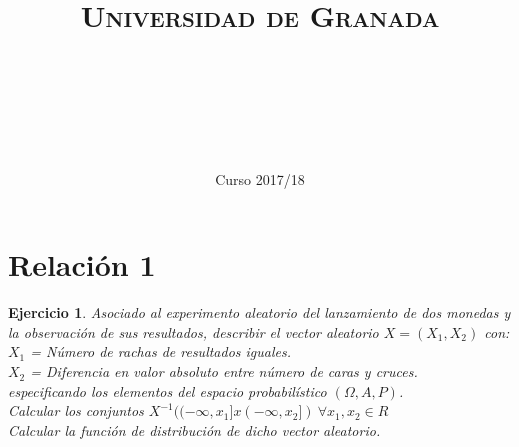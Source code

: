 \documentclass[11pt, a4paper]{article}
\title{
  \normalfont \normalsize 
  \textsc{Universidad de Granada} \\ [25pt]    %
  \horrule{0.5pt} \\[0.4cm] %
  \huge \sffamily\subject\\ %
  \horrule{2pt} \\[0.5cm] %
}
\author{\Large\sffamily{\docauthor}}
\date{\vspace{-1.5em} \normalsize \sffamily Curso 2017/18}
\newif\IfInSansMode
\theoremstyle{theorem-style}
\theoremstyle{definition-style}
\newtheorem{ejer}{Ejercicio}[section]
\theoremstyle{remark-style}
\theoremstyle{example-style}
\begin{document}
\maketitle  %
\vfill
\begin{center}
\end{center}
\newpage
\tableofcontents    %
\newpage



\section{Relación 1}

\begin{ejer}
Asociado al experimento aleatorio del lanzamiento de dos monedas y la observación de sus resultados, describir el vector aleatorio $X = (X_1,X_2)$ con: \\
$X_1$ = Número de rachas de resultados iguales. \\
$X_2$ = Diferencia en valor absoluto entre número de caras y cruces. \\
especificando los elementos del espacio probabilístico $(\Omega,A,P)$. \\
Calcular los conjuntos $X^{-1}((-\infty,x_1]x(-\infty,x_2]) \ \forall x_1,x_2 \in R$ \\
Calcular la función de distribución de dicho vector aleatorio.
\end{ejer}
\end{document}
